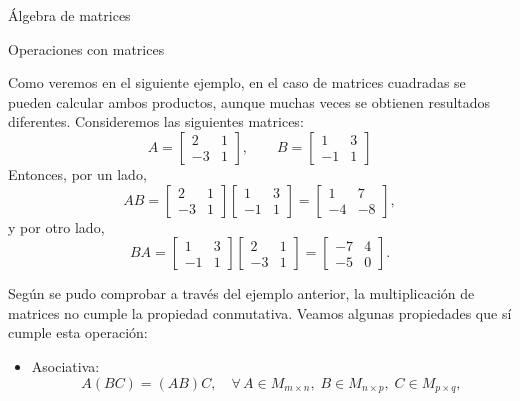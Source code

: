 \begin{chapter}{\'Algebra de matrices}
\begin{section}{Operaciones con matrices}
                
                Como veremos en el siguiente ejemplo, en  el caso de matrices cuadradas se pueden calcular ambos productos, aunque muchas veces se obtienen resultados diferentes. Consideremos las siguientes matrices:
                \begin{equation*}
                A = \begin{bmatrix}2&1\\-3&1\end{bmatrix}, \qquad 
                B = \begin{bmatrix}1&3\\-1&1\end{bmatrix}
                \end{equation*}
                Entonces, por un lado,
                \begin{equation*}
                AB = \begin{bmatrix}2&1\\-3&1\end{bmatrix}
                \begin{bmatrix}1&3\\-1&1\end{bmatrix} =
                \begin{bmatrix}1&7\\-4&-8\end{bmatrix}, 
                \end{equation*}
                y por otro lado,
                \begin{equation*}
                BA = \begin{bmatrix}1&3\\-1&1\end{bmatrix} \begin{bmatrix}2&1\\-3&1\end{bmatrix}
                =\begin{bmatrix}-7&4\\-5&0\end{bmatrix}.
                \end{equation*}
                
                Según se pudo comprobar a través del ejemplo anterior, la multiplicación de matrices
                no cumple la propiedad conmutativa. Veamos algunas propiedades que sí cumple esta operación:
                \begin{itemize}
                    \item Asociativa: 
                    \begin{equation*}
                    A (B C) = (A B) C, \quad\forall\, A \in M_{m \times n}, \;B \in M_{n \times p}, \;C  \in M_{p \times q},
                    \end{equation*}
                    

\end{itemize}
\end{section}
\end{chapter}
